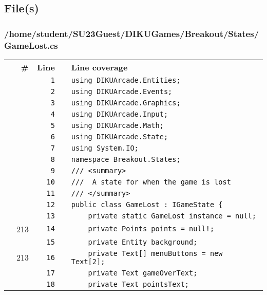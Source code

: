 \documentclass[a4paper,landscape,10pt]{article}
\begin{document}
\subsection{File(s)}
\subsubsection{/home/student/SU23Guest/DIKUGames/Breakout/States/GameLost.cs}
\begin{longtable}[l]{lrrll}
\textbf{} & \textbf{\#} & \textbf{Line} & \textbf{} & \textbf{Line coverage}\\
\cellcolor{gray} &  & \verb~1~ & & \verb~using DIKUArcade.Entities;~\\
\cellcolor{gray} &  & \verb~2~ & & \verb~using DIKUArcade.Events;~\\
\cellcolor{gray} &  & \verb~3~ & & \verb~using DIKUArcade.Graphics;~\\
\cellcolor{gray} &  & \verb~4~ & & \verb~using DIKUArcade.Input;~\\
\cellcolor{gray} &  & \verb~5~ & & \verb~using DIKUArcade.Math;~\\
\cellcolor{gray} &  & \verb~6~ & & \verb~using DIKUArcade.State;~\\
\cellcolor{gray} &  & \verb~7~ & & \verb~using System.IO;~\\
\cellcolor{gray} &  & \verb~8~ & & \verb~namespace Breakout.States;~\\
\cellcolor{gray} &  & \verb~9~ & & \verb~/// <summary>~\\
\cellcolor{gray} &  & \verb~10~ & & \verb~///  A state for when the game is lost~\\
\cellcolor{gray} &  & \verb~11~ & & \verb~/// </summary>~\\
\cellcolor{gray} &  & \verb~12~ & & \verb~public class GameLost : IGameState {~\\
\cellcolor{gray} &  & \verb~13~ & & \verb~    private static GameLost instance = null;~\\
\cellcolor{green} & 213 & \verb~14~ & & \verb~    private Points points = null!;~\\
\cellcolor{gray} &  & \verb~15~ & & \verb~    private Entity background;~\\
\cellcolor{green} & 213 & \verb~16~ & & \verb~    private Text[] menuButtons = new Text[2];~\\
\cellcolor{gray} &  & \verb~17~ & & \verb~    private Text gameOverText;~\\
\cellcolor{gray} &  & \verb~18~ & & \verb~    private Text pointsText;~\\

\end{longtable}
\end{document}
